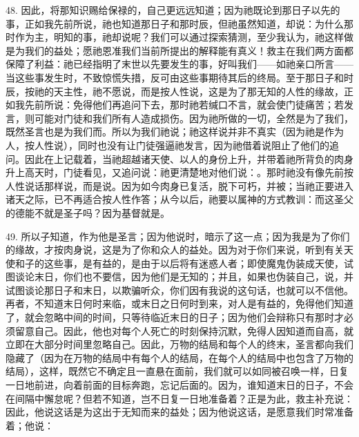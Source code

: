 48. 因此，将那知识赐给保禄的，自己更远远知道；因为祂既论到那日子以先的事，正如我先前所说，祂也知道那日子和那时辰，但祂虽然知道，却说：为什么那时作为主，明知的事，祂却说呢？我们可以通过探索猜测，至少我认为，祂这样做是为我们的益处；愿祂恩准我们当前所提出的解释能有真义！救主在我们两方面都保障了利益：祂已经指明了末世以先要发生的事，好叫我们——如祂亲口所言——当这些事发生时，不致惊慌失措，反可由这些事期待其后的终局。至于那日子和时辰，按祂的天主性，祂不愿说，而是按人性说，这是为了那无知的人性的缘故，正如我先前所说：免得他们再追问下去，那时祂若缄口不言，就会使门徒痛苦；若发言，则可能对门徒和我们所有人造成损伤。因为祂所做的一切，全然是为了我们，既然圣言也是为我们而。所以为我们祂说；祂这样说并非不真实（因为祂是作为人，按人性说），同时也没有让门徒强逼祂发言，因为祂借着说阻止了他们的追问。因此在上记载着，当祂超越诸天使、以人的身份上升，并带着祂所背负的肉身升上高天时，门徒看见，又追问说：祂更清楚地对他们说：。那时祂没有像先前按人性说话那样说，而是说。因为如今肉身已复活，脱下可朽，并被；当祂正要进入诸天之际，已不再适合按人性作答；从今以后，祂要以属神的方式教训：而这圣父的德能不就是圣子吗？因为基督就是。\par

49. 所以子知道，作为他是圣言；因为他说时，暗示了这一点；因为我是为了你们的缘故，才按肉身说，这是为了你和众人的益处。因为对于你们来说，听到有关天使和子的这些事，是有益的，是由于以后将有迷惑人者；即使魔鬼伪装成天使，试图谈论末日，你们也不要信，因为他们是无知的；并且，如果也伪装自己，说，并试图谈论那日子和末日，以欺骗听众，你们因有我说的这句话，也就可以不信他。再者，不知道末日何时来临，或末日之日何时到来，对人是有益的，免得他们知道了，就会忽略中间的时间，只等待临近末日的日子；因为他们会辩称只有那时才必须留意自己。因此，他也对每个人死亡的时刻保持沉默，免得人因知道而自高，就立即在大部分时间里忽略自己。因此，万物的结局和每个人的终末，圣言都向我们隐藏了（因为在万物的结局中有每个人的结局，在每个人的结局中也包含了万物的结局），这样，既然它不确定且一直悬在面前，我们就可以如同被召唤一样，日复一日地前进，向着前面的目标奔跑，忘记后面的。因为，谁知道末日的日子，不会在间隔中懈怠呢？但若不知道，岂不日复一日地准备着？正是为此，救主补充说： 因此，他说这话是为这出于无知而来的益处；因为他说这话，是愿意我们时常准备着；他说：\par

